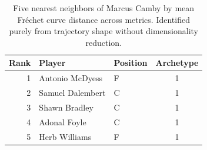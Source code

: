 \begin{table}[htbp]
  \centering\small
  \begin{tabular}{rllc}
    \toprule
    Rank & Player & Position & Archetype \\
    \midrule
    1 & Antonio McDyess & F & 1 \\
    2 & Samuel Dalembert & C & 1 \\
    3 & Shawn Bradley & C & 1 \\
    4 & Adonal Foyle & C & 1 \\
    5 & Herb Williams & F & 1 \\
    \bottomrule
  \end{tabular}
  \caption{Five nearest neighbors of Marcus Camby by mean Fr\'{e}chet curve distance across metrics. Identified purely from trajectory shape without dimensionality reduction.}
  \label{tab:Marcus_Camby_frechet_curve_neighbors}
\end{table}

